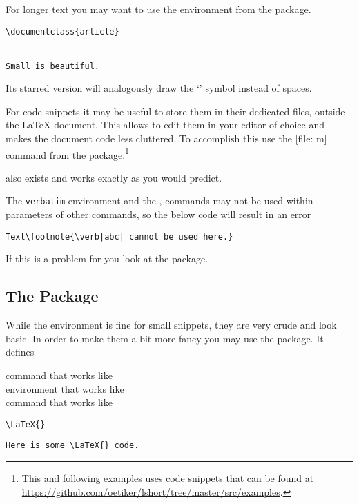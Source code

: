 For longer text you may want to use the  environment from the
 package.
\begin{example}
\begin{verbatim}
\documentclass{article}


Small is beautiful.

\end{verbatim}
\end{example}
Its starred version will analogously draw the \enquote*{\textvisiblespace}
symbol instead of spaces.

For code snippets it may be useful to store them in their dedicated files,
outside the \LaTeX{} document. This allows to edit them in your editor of
choice and makes the document code less cluttered. To accomplish this use the
[file: m] command from the  package.\footnote{This
  and following examples uses code snippets that can be found at \url{https://github.com/oetiker/lshort/tree/master/src/examples}.}
\begin{example}[examplewidth=0.55\linewidth, vertical_mode]

\end{example}
 also exists and works exactly as you would predict.

The \texttt{verbatim} environment and the , 
commands may not be used within parameters of other commands, so the below code
will result in an error
\begin{verbatim}
Text\footnote{\verb|abc| cannot be used here.}
\end{verbatim}
If this is a problem for you look at the  package.

\subsection{The  Package}

While the  environment is fine for small snippets, they are very
crude and look basic. In order to make them a bit more fancy you may use the
 package. It defines
\begin{lscommand}
   command that works like  \\
   environment that works like  \\
   command that works like 
\end{lscommand}
\begin{example}[examplewidth=0.6\linewidth, vertical_mode]
\lstinline|\LaTeX{}|

\begin{lstlisting}
Here is some \LaTeX{} code.
\end{lstlisting}


\end{example}

